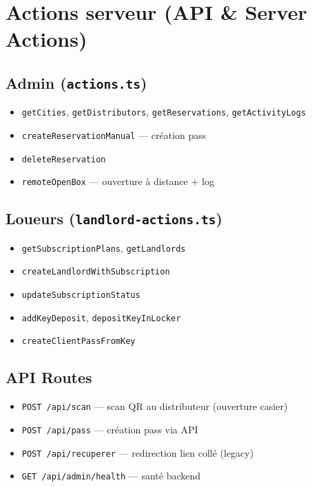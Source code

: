 \documentclass[11pt,a4paper]{article}
\begin{document}
\section{Actions serveur (API \& Server Actions)}

\subsection{Admin (\texttt{actions.ts})}
\begin{itemize}[noitemsep]
  \item \texttt{getCities}, \texttt{getDistributors}, \texttt{getReservations}, \texttt{getActivityLogs}
  \item \texttt{createReservationManual} — création pass
  \item \texttt{deleteReservation}
  \item \texttt{remoteOpenBox} — ouverture à distance + log
\end{itemize}

\subsection{Loueurs (\texttt{landlord-actions.ts})}
\begin{itemize}[noitemsep]
  \item \texttt{getSubscriptionPlans}, \texttt{getLandlords}
  \item \texttt{createLandlordWithSubscription}
  \item \texttt{updateSubscriptionStatus}
  \item \texttt{addKeyDeposit}, \texttt{depositKeyInLocker}
  \item \texttt{createClientPassFromKey}
\end{itemize}

\subsection{API Routes}
\begin{itemize}[noitemsep]
  \item \texttt{POST /api/scan} — scan QR au distributeur (ouverture casier)
  \item \texttt{POST /api/pass} — création pass via API
  \item \texttt{POST /api/recuperer} — redirection lien collé (legacy)
  \item \texttt{GET /api/admin/health} — santé backend
\end{itemize}
\end{document}
